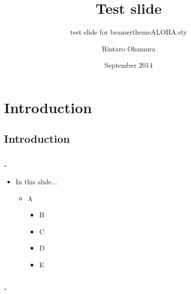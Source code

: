 \documentclass[ignorenonframetext,14pt]{beamer}
\title[]{\HelvNeueB Test slide}
\subtitle{\HelvNeueB test slide for beamerthemeALOHA.sty}
\author[]{\HelvNeueT Rintaro Okamura}
\institute[]{}
\date[]{\HelvNeueT September 2014}
\def\wingdsqr{{\fontspec{Wingdings Regular} p}}
\def\wingdsqflr{{\fontspec{Wingdings Regular} v}}
\def\wingdrarrow{{\fontspec{Wingdings 3} g}}
\begin{document}
\begin{frame}
    \maketitle
    \thispagestyle{empty}
\end{frame}

\section{Introduction}

\subsection{Introduction}

\begin{frame}
    \frametitle{\insertsubsectionnumber. \insertsubsectionhead}

    \begin{itemize}
        \item[\Large \wingdrarrow] \large In this slide...
            \begin{itemize}
                \normalsize
                \item[\wingdsqr] A
                \begin{itemize}
                    \normalsize
                    \item[\wingdsqflr] \textcolor{ALHPink}{B}
                    \item[\wingdsqflr] \textcolor{ALHBlue}{C}
                    \item[\wingdsqflr] D
                    \item[\wingdsqflr] E
                \end{itemize}
            \end{itemize}
    \end{itemize}
\end{frame}

\begin{frame}
    \frametitle{\insertsubsectionnumber. \insertsubsectionhead}

\end{frame}


\end{document}
